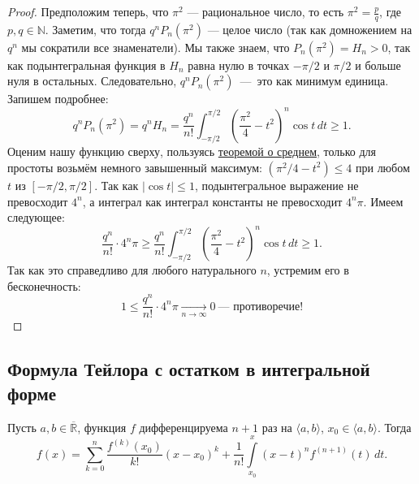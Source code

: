 \begin{proof}
	Предположим теперь, что \(\pi^2\) --- рациональное число, то есть \(\pi^2 = \frac{p}{q}\), где \(p, q \in \mathbb{N}\).
	Заметим, что тогда \(q^n P_n(\pi^2)\) --- целое число (так как домножением на \(q^n\) мы сократили все знаменатели).
	Мы также знаем, что \(P_n(\pi^2) = H_n > 0\), так как подынтегральная функция в \(H_n\) равна нулю в точках \(-\pi/2\) и \(\pi/2\) и больше нуля в остальных.
	Следовательно, \(q^n P_n(\pi^2)\)~---~это как минимум единица. Запишем подробнее: \[
		q^n P_n(\pi^2) = q^n H_n = \frac{q^n}{n!} \int_{-\pi/2}^{\pi/2} \left(\frac{\pi^2}4 - t^2 \right)^n \cos t \, dt \geqslant 1.
	\] 
	Оценим нашу функцию сверху, пользуясь \hyperlink{t7_2}{теоремой о среднем}, только для простоты возьмём немного завышенный максимум: \(\left(\pi^2/4 - t^2 \right) \leqslant 4\) при любом \(t\) из \([-\pi/2, \pi/2]\).
	Так как \(|\cos t| \leqslant 1\), подынтегральное выражение не превосходит \(4^n\), а интеграл как интеграл константы не превосходит \(4^n \pi\). Имеем следующее: \[
		\frac{q^n}{n!} \cdot 4^n \pi \geqslant \frac{q^n}{n!} \int_{-\pi/2}^{\pi/2} \left(\frac{\pi^2}4 - t^2 \right)^n \cos t \, dt \geqslant 1.
	\]
	Так как это справедливо для любого натурального \(n\), устремим его в бесконечность: \[
	1 \leqslant \frac{q^n}{n!} \cdot 4^n \pi \xrightarrow[n \to \infty]{} 0 \ \text{--- противоречие!}
	\]
\end{proof}

\subsection{Формула Тейлора с остатком в интегральной форме}

\begin{theorem}
	Пусть \(a, b \in \overline{\mathbb{R}}\), функция \(f\) дифференцируема \(n + 1\) раз на \(\langle a, b \rangle\), \(x_0 \in \langle a, b \rangle\). Тогда \[
	f(x) = \sum_{k = 0}^n \frac{f^{(k)}(x_0)}{k!} (x - x_0)^k +
	\frac{1}{n!} \int\limits_{x_0}^x (x - t)^n f^{(n + 1)}(t) \, dt.
	\]
\end{theorem}

